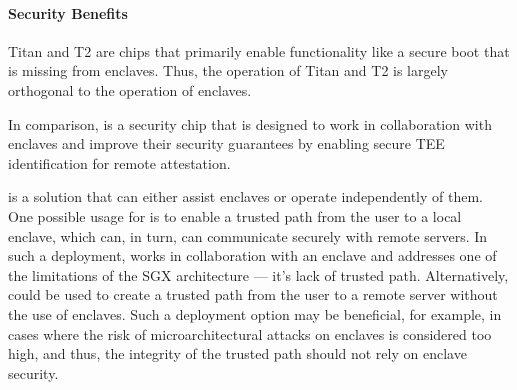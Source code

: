 \paragraph{Security Benefits}
Titan and T2 are chips that primarily enable functionality like a secure boot that is missing from enclaves. Thus, the operation of Titan and T2 is largely orthogonal to the operation of enclaves. 

In comparison, \proximitee is a security chip that is designed to work in collaboration with enclaves and improve their security guarantees by enabling secure TEE identification for remote attestation. 

\protection is a solution that can either assist enclaves or operate independently of them. One possible usage for \protection is to enable a trusted path from the user to a local enclave, which can, in turn, can communicate securely with remote servers. In such a deployment, \protection works in collaboration with an enclave and addresses one of the limitations of the SGX architecture --- it's lack of trusted path. Alternatively, \protection could be used to create a trusted path from the user to a remote server without the use of enclaves. Such a deployment option may be beneficial, for example, in cases where the risk of microarchitectural attacks on enclaves is considered too high, and thus, the integrity of the trusted path should not rely on enclave security.


